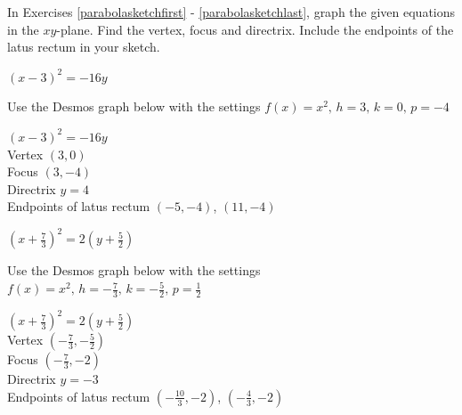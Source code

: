 \documentclass{ximera}
\begin{document}
	\author{Stitz-Zeager}



\label{ExercisesforParabolas}

\begin{question}
In Exercises \ref{parabolasketchfirst} - \ref{parabolasketchlast},  graph the given equations in the $xy$-plane.  Find the vertex, focus and directrix.  Include the endpoints of the latus rectum in your sketch.

\begin{problem}\label{parabolasketchfirst}
    $(x - 3)^{2} = -16y$

\begin{solution}
Use the Desmos graph below with the settings $f(x)=x^2,\,h=3,\,k=0,\,p=-4$

\begin{center} 
\end{center}
{$(x - 3)^{2} = -16y$}\\
{Vertex $(3, 0)$}\\
{Focus $(3, -4)$}\\
{Directrix $y = 4$}\\
{Endpoints of latus rectum $(-5, -4)$, $(11, -4)$}\\
\end{solution} 
\end{problem}

\begin{problem}
    $\left(x + \frac{7}{3}\right)^{2} = 2\left(y + \frac{5}{2}\right)$

\begin{solution}
Use the Desmos graph below with the settings $f(x)=x^2,\,h=-\frac{7}{3},\,k=-\frac{5}{2},\,p=\frac{1}{2}$

\begin{center} 
\end{center}
{$\left(x + \frac{7}{3}\right)^{2} = 2\left(y + \frac{5}{2}\right)$}\\
{Vertex $\left(-\frac{7}{3}, -\frac{5}{2} \right)$}\\
{Focus $\left(-\frac{7}{3}, -2 \right)$}\\
{Directrix $y = -3$}\\
{Endpoints of latus rectum $\left(-\frac{10}{3}, -2 \right)$, $\left(-\frac{4}{3}, -2 \right)$}\\
\end{solution} 
\end{problem}


\end{question}
\end{document}
